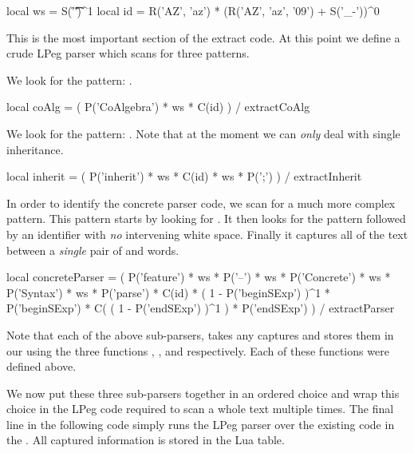   local ws       = S('\r\n\f\t ')^1
  local id       = R('AZ', 'az') * (R('AZ', 'az', '09') + S('_-'))^0
\stopLuaCode

This is the most important section of the extract code. At this point we 
define a crude LPeg parser which scans for three patterns.

\startitemize[n]

\item {} We look for the pattern: . 

\startLuaCode
  local coAlg =
    ( P('CoAlgebra') * ws * C(id) ) / extractCoAlg
\stopLuaCode

\item {} We look for the pattern: . 
Note that at the moment we can \emph{only} deal with single inheritance. 

\startLuaCode
  local inherit  =
    ( P('inherit') * ws * C(id) * ws * P(';') ) / extractInherit
\stopLuaCode

\item {} In order to identify the concrete parser 
code, we scan for a much more complex pattern. This pattern starts by 
looking for . It then looks for the 
pattern  followed by an identifier with \emph{no} intervening 
white space. Finally it captures all of the text between a \emph{single} 
pair of  and  words. 

\startLuaCode
  local concreteParser   = (
    P('feature') * ws * P('--') * ws * 
    P('Concrete') * ws * P('Syntax') * ws *
    P('parse') * C(id) * 
    ( 1 - P('beginSExp') )^1 *  P('beginSExp') *
    C( ( 1 - P('endSExp') )^1 ) * P('endSExp')
    ) / extractParser
\stopLuaCode

\stopitemize

Note that each of the above sub-parsers, takes any captures and stores 
them in our  using the three functions 
, , and  
respectively. Each of these functions were defined above.

We now put these three sub-parsers together in an ordered choice and wrap 
this choice in the LPeg code required to scan a whole text multiple times. 
The final line in the following code simply runs the LPeg parser over the 
existing code in the . All captured information is 
stored in the  Lua table. 

